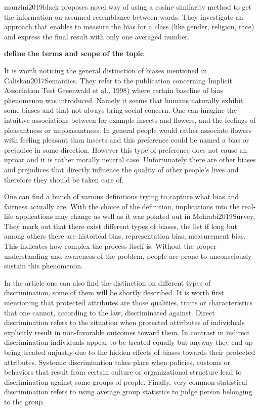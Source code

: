 \documentclass[12pt,]{book}
\begin{document}
manzini2019black proposes novel way of using a cosine similarity method
to get the information on assumed resemblance between words. They
investigate an approach that enables to measure the bias for a class
(like gender, religion, race) and express the final result with only one
averaged number. \newline

\textbf{define the terms and scope of the topic}

It is worth noticing the general distinction of biases mentioned in
Caliskan2017Semantics. They refer to the publication concerning Implicit
Association Test Greenwald et al., 1998) where certain baseline of bias
phenomenon was introduced. Namely it seems that humans naturally exhibit
some biases and that not always bring social concern. One can imagine
the intuitive associations between for example insects and flowers, and
the feelings of pleasantness or unpleasantness. In general people would
rather associate flowers with feeling pleasant than insects and this
preference could be named a bias or prejudice in some direction. However
this type of preference does not cause an uproar and it is rather
morally neutral case. Unfortunately there are other biases and
prejudices that directly influence the quality of other people's lives
and therefore they should be taken care of.

One can find a bunch of various definitions trying to capture what bias
and fairness actually are. With the choice of the definition,
implications into the real-life applications may change as well as it
was pointed out in Mehrabi2019Survey. They mark out that there exist
different types of biases, the list if long but among others there are
historical bias, representation bias, measurement bias. This indicates
how complex the process itself is. Without the proper understanding and
awareness of the problem, people are prone to unconsciously sustain this
phenomenon.

In the article one can also find the distinction on different types of
discrimination, some of them will be shortly described. It is worth
first mentioning that protected attributes are those qualities, traits
or characteristics that one cannot, according to the law, discriminated
against. Direct discrimination refers to the situation when protected
attributes of individuals explicitly result in non-favorable outcomes
toward them. In contrast in indirect discrimination individuals appear
to be treated equally but anyway they end up being treated unjustly due
to the hidden effects of biases towards their protected attributes.
Systemic discrimination takes place when policies, customs or behaviors
that result from certain culture or organizational structure lead to
discrimination against some groups of people. Finally, very common
statistical discrimination refers to using average group statistics to
judge person belonging to the group.
\end{document}
